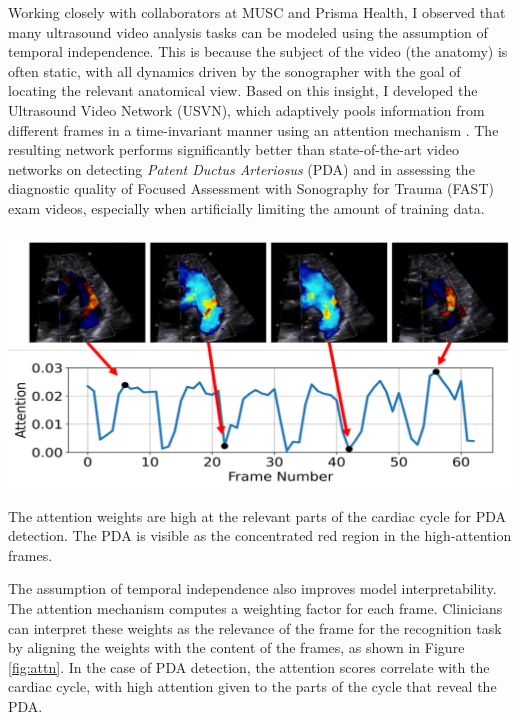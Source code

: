 \documentclass{tufte-handout}
\begin{document}
Working closely with collaborators at MUSC and Prisma Health, I observed that many ultrasound video analysis tasks can be modeled using the assumption of temporal independence. This is because the subject of the video (the anatomy) is often static, with all dynamics driven by the sonographer with the goal of locating the relevant anatomical view. Based on this insight, I developed the Ultrasound Video Network (USVN), which adaptively pools information from different frames in a time-invariant manner using an attention mechanism \citep{smith2023relevance}. The resulting network performs significantly better than state-of-the-art video networks on detecting {\it Patent Ductus Arteriosus} (PDA) and in assessing the diagnostic quality of Focused Assessment with Sonography for Trauma (FAST) exam videos, especially when artificially limiting the amount of training data.

\begin{marginfigure}
  \includegraphics[width=\linewidth]{attn}
  \caption{The attention weights are high at the relevant parts of the cardiac cycle for PDA detection. The PDA is visible as the concentrated red region in the high-attention frames.}
  \label{fig:attn}
\end{marginfigure}
The assumption of temporal independence also improves model interpretability. The attention mechanism computes a weighting factor for each frame. Clinicians can interpret these weights as the relevance of the frame for the recognition task by aligning the weights with the content of the frames, as shown in Figure \ref{fig:attn}. In the case of PDA detection, the attention scores correlate with the cardiac cycle, with high attention given to the parts of the cycle that reveal the PDA.
\end{document}
